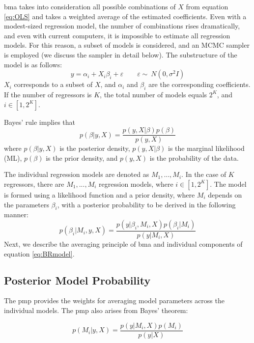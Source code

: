 \documentclass[a4paper,11pt]{article}
\begin{document}
\ac{bma} takes into consideration all possible combinations of $X$ from equation \ref{eq:OLS} and takes a weighted average of the estimated coefficients. Even with a modest-sized regression model, the number of combinations rises dramatically, and even with current computers, it is impossible to estimate all regression models. For this reason, a subset of models is considered, and an MCMC sampler is employed (we discuss the sampler in detail below). The substructure of the model is as follows:
%
\begin{equation}\label{eq:OLSsub}
y = \alpha_{i} + X_{i}\beta_{i}+ \varepsilon \qquad \varepsilon  \sim\ N(0, \sigma^{2}I)
\end{equation}
%
$X_{i}$ corresponds to a subset of $X$, and $\alpha_{i} $ and $ \beta_{i}$ are the corresponding coefficients. If the number of regressors is $K$, the total number of models equals $2^{K}$, and $i \in [1,2^{K}]$. 

Bayes' rule implies that
%
\begin{equation}\label{eq:BRmodel}
p(\beta \vert y,X) = \frac{p(y,X\vert \beta)p(\beta)}{p(y,X)}
\end{equation}
where $p(\beta \vert y, X)$ is the posterior density, $p(y, X\vert \beta)$ is the marginal likelihood (ML), $p(\beta)$ is the prior density, and $p(y,X)$ is the probability of the data. 

The individual regression models are denoted as $M_{1},...,M_{i}$. In the case of $K$ regressors, there are $M_{1},...,M_{i}$ regression models, where $i \in [1,2^{K}]$. The model is formed using a likelihood function and a prior density, where $M_{i}$ depends on the parameters $\beta_{i}$, with a posterior probability to be derived in the following manner:
\begin{equation}\label{eq:BROM}
p(\beta_{i} \vert M_{i},y,X) = \frac{p(y\vert \beta_{i},M_{i},X)p(\beta_{i}\vert M_{i})}{p(y \vert M_{i},X)}
\end{equation}
Next, we describe the averaging principle of \ac{bma} and individual components of equation \ref{eq:BRmodel}.
%
\subsection*{Posterior Model Probability}
%
The \ac{pmp} provides the weights for averaging model parameters across the individual models. The \ac{pmp} also arises from Bayes' theorem:

\begin{equation}\label{eq:PMPmain}
p(M_{i} \vert y,X) = \frac{p(y\vert M_{i},X)p(M_{i})}{p(y \vert X)}
\end{equation}
\end{document}
